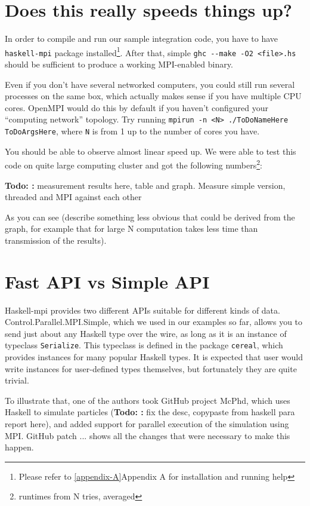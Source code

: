 \documentclass{tmr}
\newcommand{\Todo}[1]{{\textbf{Todo: #1}}}
\begin{document}
\section{Does this really speeds things up?}

In order to compile and run our sample integration code, you have to
have \verb|haskell-mpi| package installed\footnote{Please refer to
  \ref{appendix-A}{Appendix A} for installation and running help}. After that,
simple \verb|ghc --make -O2 <file>.hs| should be sufficient to produce
a working MPI-enabled binary.

Even if you don't have several networked computers, you could still
run several processes on the same box, which actually makes sense if
you have multiple CPU cores. OpenMPI would do this by default if you
haven't configured your ``computing network'' topology. Try running
\verb|mpirun -n <N> ./ToDoNameHere ToDoArgsHere|, where \verb|N| is
from 1 up to the number of cores you have.

You should be able to observe almost linear speed up. We were able to
test this code on quite large computing cluster and got the following
numbers\footnote{runtimes from N tries, averaged}:

\Todo: measurement results here, table and graph. Measure simple version, threaded and MPI against each other

As you can see (describe something less obvious that could be derived
from the graph, for example that for large N computation takes less
time than transmission of the results).

\section{Fast API vs Simple API}

Haskell-mpi provides two different APIs suitable for different kinds
of data. Control.Parallel.MPI.Simple, which we used in our examples so
far, allows you to send just about any Haskell type over the wire, as
long as it is an instance of typeclass \verb|Serialize|. This
typeclass is defined in the package \verb|cereal|, which provides
instances for many popular Haskell types. It is expected that user
would write instances for user-defined types themselves, but
fortunately they are quite trivial.

To illustrate that, one of the authors took GitHub project McPhd,
which uses Haskell to simulate particles (\Todo: fix the desc,
copypaste from haskell para report here), and added support for
parallel execution of the simulation using MPI. GitHub patch ... shows
all the changes that were necessary to make this happen.
\end{document}
